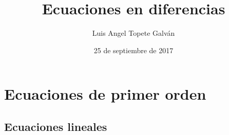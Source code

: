 \documentclass{article}
\title{Ecuaciones en diferencias}
\author{Luis Angel Topete Galván}
\date{25 de septiembre de 2017}
\begin{document}
\maketitle

\section{Ecuaciones de primer orden}

\subsection{Ecuaciones lineales}
\end{document}
